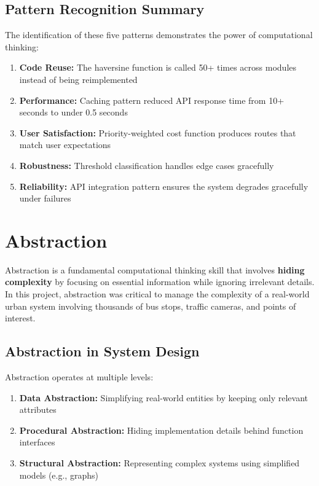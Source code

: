 \subsection{Pattern Recognition Summary}

The identification of these five patterns demonstrates the power of computational thinking:

\begin{enumerate}[noitemsep]
    \item \textbf{Code Reuse:} The haversine function is called 50+ times across modules instead of being reimplemented
    \item \textbf{Performance:} Caching pattern reduced API response time from 10+ seconds to under 0.5 seconds
    \item \textbf{User Satisfaction:} Priority-weighted cost function produces routes that match user expectations
    \item \textbf{Robustness:} Threshold classification handles edge cases gracefully
    \item \textbf{Reliability:} API integration pattern ensures the system degrades gracefully under failures
\end{enumerate}


\section{Abstraction}
Abstraction is a fundamental computational thinking skill that involves \textbf{hiding complexity} by focusing on essential information while ignoring irrelevant details. In this project, abstraction was critical to manage the complexity of a real-world urban system involving thousands of bus stops, traffic cameras, and points of interest.

\subsection{Abstraction in System Design}
Abstraction operates at multiple levels:

\begin{enumerate}
    \item \textbf{Data Abstraction:} Simplifying real-world entities by keeping only relevant attributes
    \item \textbf{Procedural Abstraction:} Hiding implementation details behind function interfaces
    \item \textbf{Structural Abstraction:} Representing complex systems using simplified models (e.g., graphs)
\end{enumerate}

